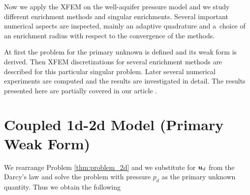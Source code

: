 

Now we apply the XFEM on the well-aquifer pressure model and we study different enrichment methods and singular enrichments.
Several important numerical aspects are inspected, mainly an adaptive quadrature and
a~choice of an enrichment radius with respect to the convergence of the methods.

At first the problem for the primary unknown is defined and its weak form is derived. Then
XFEM discretizations for several enrichment methods are described for this particular singular problem.
Later several numerical experiments are computed and the results are investigated in detail.
The results presented here are partially covered in our article \cite{exner_2016}.


\section{Coupled 1d-2d Model (Primary Weak Form)}
\label{sec:primary_form}

We rearrange Problem \ref{thm:problem_2d} and we substitute for $\mathbf{\boldsymbol{u}}_d$ from the Darcy's law and solve the problem
with pressure $p_d$ as the primary unknown quantity. Thus we obtain the following


